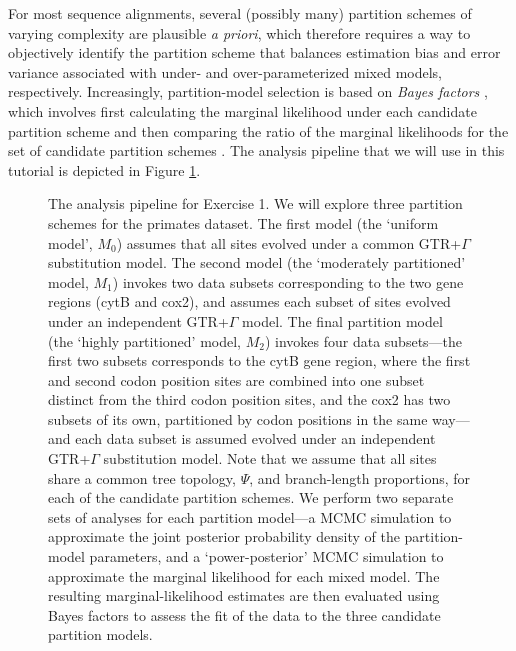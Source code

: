 For most sequence alignments, several (possibly many) partition schemes of varying complexity are plausible \emph{a priori}, which therefore requires a way to objectively identify the partition scheme that balances estimation bias and error variance associated with under- and over-parameterized mixed models, respectively.
Increasingly, partition-model selection is based on \textit{Bayes factors} \citep[\EG][]{Suchard2001}, which involves first calculating the marginal likelihood under each candidate partition scheme and then comparing the ratio of the marginal likelihoods for the set of candidate partition schemes \citep{Brandley2005,Nylander2004,Mcguire2007}.
The analysis pipeline that we will use in this tutorial is depicted in Figure \ref{fig:pipeline}.

\begin{figure}[ht!]
\centering
{}
\caption{\small The analysis pipeline for Exercise 1. We will explore three partition schemes for the primates dataset.
The first model (the `uniform model', $M_0$) assumes that all sites evolved under a common GTR+$\Gamma$ substitution model.
The second model (the `moderately partitioned' model, $M_1$) invokes two data subsets corresponding to the two gene regions (cytB and cox2), and assumes each subset of sites evolved under an independent GTR+$\Gamma$ model.
The final partition model (the `highly partitioned' model, $M_2$) invokes four data subsets---the first two subsets corresponds to the cytB gene region, where the first and second codon position sites are combined into one subset distinct from the third codon position sites, and the cox2 has two subsets of its own, partitioned by codon positions in the same way---and each data subset is assumed evolved under an independent GTR+$\Gamma$ substitution model.
Note that we assume that all sites share a common tree topology, $\Psi$, and branch-length proportions, for each of the candidate partition schemes.
We perform two separate sets of analyses for each partition model---a MCMC simulation to approximate the joint posterior probability density of the partition-model parameters, and a `power-posterior' MCMC simulation to approximate the marginal likelihood for each mixed model.
The resulting marginal-likelihood estimates are then evaluated using Bayes factors to assess the fit of the data to the three candidate partition models.  
}
\label{fig:pipeline}
\end{figure}
\newpage



